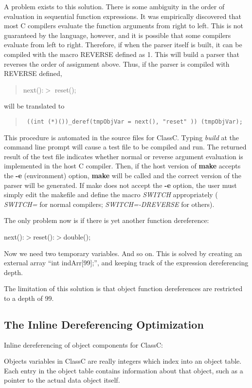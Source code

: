 A problem exists to this solution.
There is some ambiguity in the order of evaluation in sequential
function expressions.  It was empirically discovered that most C
compilers evaluate the function arguments from right to left.  This
is not guaranteed by the language, however, and it is possible that
some compilers evaluate from left to right.  Therefore, if
when the parser itself is built, it can be compiled with the
macro REVERSE defined as 1.  This will build a parser that reverses
the order of assignment above.  Thus, if the parser is compiled
with REVERSE defined,
\begin{quote}
next():$>$ reset();
\end{quote}
will be translated to
\begin{quote} \tt
((int (*)())\_deref(tmpObjVar = next(), "reset" )) (tmpObjVar);
\end{quote}
This procedure is automated in the source files for ClassC.  Typing
{\em build} at the command line prompt will cause a test file to be
compiled and run.  The returned result of the test file indicates
whether normal or reverse argument evaluation is implemented in
the host C compiler.  Then, if the host version of {\bf make} accepts
the {\bf -e} (environment) option, {\bf make} will be called and the correct
version of the parser will be generated.  If make does not accept
the {\bf -e} option, the user must simply edit the makefile and define
the macro {\em SWITCH} appropriately ( {\em SWITCH= } for normal compilers;
{\em SWITCH=-DREVERSE} for others).

The only problem now is if there is yet another function dereference:

\noindent next():$>$reset():$>$double();

Now we need two temporary variables.  And so on.  This is solved by
creating an external array ``int indArr[99];'', and keeping track
of the expression dereferencing depth.

The limitation of this solution is that object function
dereferences are restricted to a depth of 99.

\subsection{The Inline Dereferencing Optimization}

Inline dereferencing of object components for ClassC:

Objects variables in ClassC are really integers which index into 
an object table.  Each entry in the object table contains information
about that object, such as a pointer to the actual data object itself.


